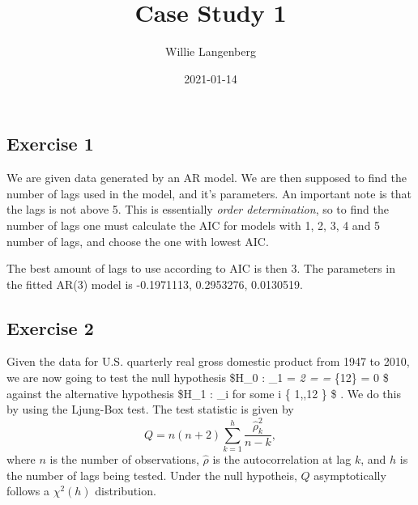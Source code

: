 \documentclass[
]{article}
\title{Case Study 1}
\author{Willie Langenberg}
\date{2021-01-14}
\newenvironment{Shaded}{\begin{snugshade}}{\end{snugshade}}
\newcommand{\CommentTok}[1]{\textcolor[rgb]{0.56,0.35,0.01}{\textit{#1}}}
\newcommand{\DataTypeTok}[1]{\textcolor[rgb]{0.13,0.29,0.53}{#1}}
\newcommand{\DecValTok}[1]{\textcolor[rgb]{0.00,0.00,0.81}{#1}}
\newcommand{\KeywordTok}[1]{\textcolor[rgb]{0.13,0.29,0.53}{\textbf{#1}}}
\newcommand{\NormalTok}[1]{#1}
\newcommand{\OperatorTok}[1]{\textcolor[rgb]{0.81,0.36,0.00}{\textbf{#1}}}
\newcommand{\OtherTok}[1]{\textcolor[rgb]{0.56,0.35,0.01}{#1}}
\newcommand{\StringTok}[1]{\textcolor[rgb]{0.31,0.60,0.02}{#1}}
\begin{document}
\maketitle

\hypertarget{exercise-1}{%
\subsection{Exercise 1}\label{exercise-1}}

We are given data generated by an AR model. We are then supposed to find
the number of lags used in the model, and it's parameters. An important
note is that the lags is not above 5. This is essentially \emph{order
determination}, so to find the number of lags one must calculate the AIC
for models with 1, 2, 3, 4 and 5 number of lags, and choose the one with
lowest AIC.

\begin{Shaded}
\end{Shaded}

The best amount of lags to use according to AIC is then 3. The
parameters in the fitted AR(3) model is -0.1971113, 0.2953276,
0.0130519.

\newpage

\hypertarget{exercise-2}{%
\subsection{Exercise 2}\label{exercise-2}}

Given the data for U.S. quarterly real gross domestic product from 1947
to 2010, we are now going to test the null hypothesis \$H\_0 : \rho\_1 =
\rho\emph{2 = \dotsc = \rho}\{12\} = 0 \$ against the alternative
hypothesis \$H\_1 : \rho\_i  \textrm{ for some } i \in \{
1,\dotsc,12 \} \$ . We do this by using the Ljung-Box test. The test
statistic is given by
\[Q = n(n+2)\sum_{k=1}^h \frac{\hat{\rho}_k^2}{n-k},\] where \(n\) is
the number of observations, \(\hat{\rho}\) is the autocorrelation at lag
\(k\), and \(h\) is the number of lags being tested. Under the null
hypotheis, \(Q\) asymptotically follows a \(\chi^2(h)\) distribution.
\end{document}

